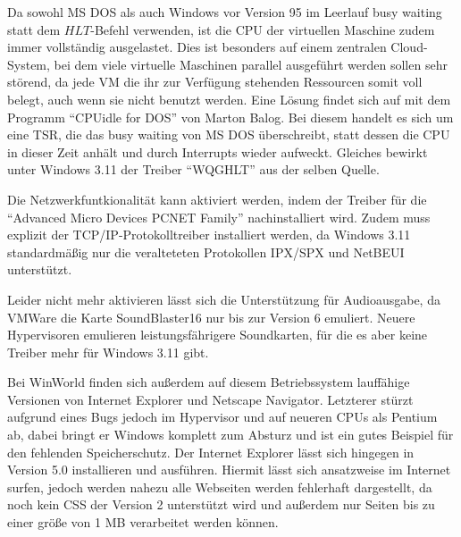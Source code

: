 	Da sowohl MS DOS als auch Windows vor Version 95 im Leerlauf busy waiting statt dem $HLT$-Befehl verwenden, ist die CPU der virtuellen Maschine zudem immer vollständig ausgelastet.
	Dies ist besonders auf einem zentralen Cloud-System, bei dem viele virtuelle Maschinen parallel ausgeführt werden sollen sehr störend, da jede VM die ihr zur Verfügung stehenden Ressourcen somit voll belegt, auch wenn sie nicht benutzt werden.
	Eine Lösung findet sich auf \cite{VMDriver} mit dem Programm "`CPUidle for DOS"' von Marton Balog.
	Bei diesem handelt es sich um eine TSR, die das busy waiting von MS DOS überschreibt, statt dessen die CPU in dieser Zeit anhält und durch Interrupts wieder aufweckt.
	Gleiches bewirkt unter Windows 3.11 der Treiber "`WQGHLT"' aus der selben Quelle.

	Die Netzwerkfuntkionalität kann aktiviert werden, indem der Treiber für die "`Advanced Micro Devices PCNET Family"' nachinstalliert wird.
	Zudem muss explizit der TCP/IP-Protokolltreiber installiert werden, da Windows 3.11 standardmäßig nur die veralteteten Protokollen IPX/SPX und NetBEUI unterstützt.

	Leider nicht mehr aktivieren lässt sich die Unterstützung für Audioausgabe, da VMWare die Karte SoundBlaster16 nur bis zur Version 6 emuliert.
	Neuere Hypervisoren emulieren leistungsfährigere Soundkarten, für die es aber keine Treiber mehr für Windows 3.11 gibt.

	Bei WinWorld finden sich außerdem auf diesem Betriebssystem lauffähige Versionen von Internet Explorer und Netscape Navigator.
	Letzterer stürzt aufgrund eines Bugs jedoch im Hypervisor und auf neueren CPUs als Pentium ab, dabei bringt er Windows komplett zum Absturz und ist ein gutes Beispiel für den fehlenden Speicherschutz.
	Der Internet Explorer lässt sich hingegen in Version 5.0 installieren und ausführen. 
	Hiermit lässt sich ansatzweise im Internet surfen, jedoch werden nahezu alle Webseiten werden fehlerhaft dargestellt, da noch kein CSS der Version 2 unterstützt wird und außerdem nur Seiten bis zu einer größe von 1 MB verarbeitet werden können. 

